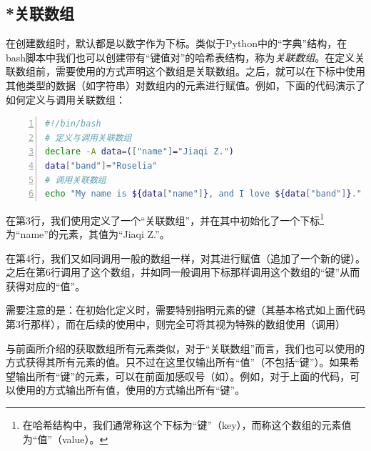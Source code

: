 \subsection{*关联数组}\label{subsec:数组-关联数组}

\begin{extend}
    在创建数组时，默认都是以数字作为下标。类似于Python中的“字典”结构，在bash脚本中我们也可以创建带有“键值对”的哈希表结构，称为\emph{关联数组}。在定义关联数组前，需要使用的方式声明这个数组是关联数组。之后，就可以在下标中使用其他类型的数据（如字符串）对数组内的元素进行赋值。例如，下面的代码演示了如何定义与调用关联数组：

    \begin{lstlisting}[language=bash,numbers=left,caption={assosiative\_array}]
#!/bin/bash
# 定义与调用关联数组
declare -A data=(["name"]="Jiaqi Z.")
data["band"]="Roselia"
# 调用关联数组
echo "My name is ${data["name"]}, and I love ${data["band"]}."
    \end{lstlisting}

    在第3行，我们使用定义了一个“关联数组”，并在其中初始化了一个下标\footnote{在哈希结构中，我们通常称这个下标为“键”（key），而称这个数组的元素值为“值”（value）。}为“name”的元素，其值为“Jiaqi Z.”。

    在第4行，我们又如同调用一般的数组一样，对其进行赋值（追加了一个新的键）。之后在第6行调用了这个数组，并如同一般调用下标那样调用这个数组的“键”从而获得对应的“值”。

    需要注意的是：在初始化定义时，需要特别指明元素的键（其基本格式如上面代码第3行那样），而在后续的使用中，则完全可将其视为特殊的数组使用（调用）

    与前面所介绍的获取数组所有元素类似，对于“关联数组”而言，我们也可以使用的方式获得其所有元素的值。只不过在这里仅输出所有“值”（不包括“键”）。如果希望输出所有“键”的元素，可以在前面加感叹号（如）。例如，对于上面的代码，可以使用的方式输出所有值，使用的方式输出所有“键”。
\end{extend}





